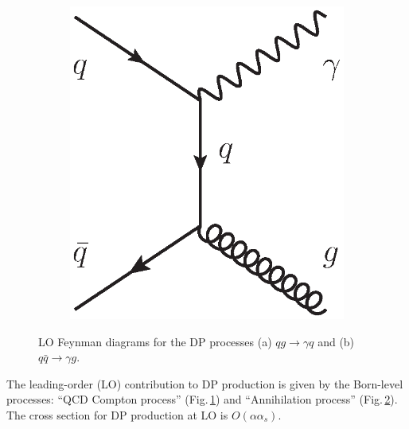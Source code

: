 \documentclass[12pt, twoside]{article}
\numberwithin{equation}{section}
\numberwithin{figure}{section}
\begin{document}
\begin{description}
\begin{figure}[h]
\begin{subfigure}[b]{0.25\textwidth}
            \caption{}
            \label{fig:D_LO_Feynman}
        \end{subfigure}
        \hspace{2.0cm}
        \begin{subfigure}[b]{0.25\textwidth}
            \includegraphics[width=\textwidth]{./images/D_LO_Feynman_2.eps}
            \caption{}
            \label{fig:D_LO_Feynman_2}
        \end{subfigure}
        \captionsetup{width=0.9\textwidth}
        \caption{LO Feynman diagrams for the DP processes (a) $q g \rightarrow{} \gamma q$ and (b) $q \bar{q} \rightarrow{} \gamma g$.}
        \label{fig:DPprocesses}
    \end{figure}

    The leading-order (LO) contribution to DP production is given by the Born-level processes: ``QCD Compton process'' (Fig.\,\ref{fig:D_LO_Feynman}) and ``Annihilation process'' (Fig.\,\ref{fig:D_LO_Feynman_2}). The cross section for DP production at LO is $O(\alpha \alpha_{s})$.


\end{description}
\end{document}
